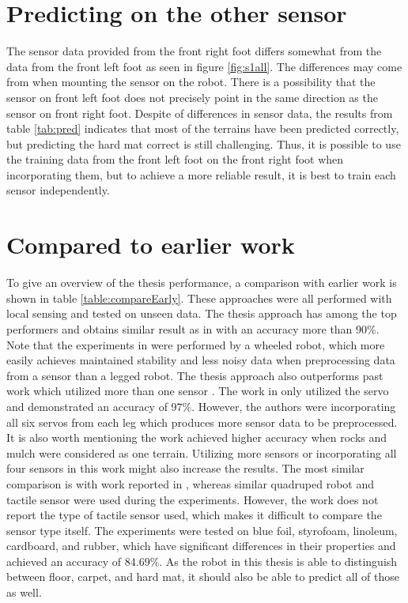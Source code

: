 \documentclass[USenglish]{ifimaster}  %
\begin{document}
\section{Predicting on the other sensor}
The sensor data provided from the front right foot differs somewhat from the data from the front left foot as seen in figure \ref{fig:s1all}. The differences may come from when mounting the sensor on the robot. There is a possibility that the sensor on front left foot does not precisely point in the same direction as the sensor on front right foot. Despite of differences in sensor data, the results from table \ref{tab:pred} indicates that most of the terrains have been predicted correctly, but predicting the hard mat correct is still challenging.  Thus, it is possible to use the training data from the front left foot on the front right foot when incorporating them, but to achieve a more reliable result, it is best to train each sensor independently.


\section{Compared to earlier work}
To give an overview of the thesis performance, a comparison with earlier work is shown in table \ref{table:compareEarly}. These approaches were all performed with local sensing and tested on unseen data. The thesis approach has among the top performers and obtains similar result as in \cite{5752869,4059113,5602459,26b23e912c654fe4b7478fd910130195} with an accuracy more than 90\%. Note that the experiments in \cite{5752869,4059113} were performed by a wheeled robot, which more easily achieves maintained stability and less noisy data when preprocessing data from a sensor than a legged robot. The thesis approach also outperforms past work which utilized more than one sensor \cite{6849778,6386243}. The work in \cite{26b23e912c654fe4b7478fd910130195} only utilized the servo and demonstrated an accuracy of 97\%.  However, the authors were incorporating all six servos from each leg which produces more sensor data to be preprocessed. It is also worth mentioning the work achieved higher accuracy when rocks and mulch were considered as one terrain. Utilizing more sensors or incorporating all four sensors in this work might also increase the results. The most similar comparison is with work reported in \cite{6784609}, whereas similar quadruped robot and tactile sensor were used during the experiments. However, the work does not report the type of tactile sensor used, which makes it difficult to compare the sensor type itself. The experiments were tested on blue foil, styrofoam, linoleum, cardboard, and rubber, which have significant differences in their properties and achieved an accuracy of 84.69\%. As the robot in this thesis is able to distinguish between floor, carpet, and hard mat, it should also be able to predict all of those as well.
\end{document}
